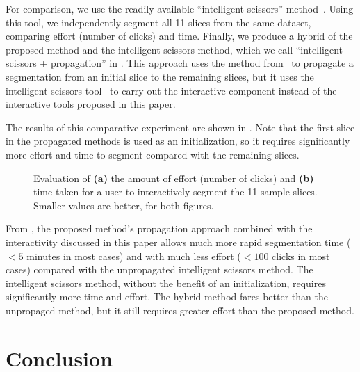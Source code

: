 \documentclass[]{spie}  %
\begin{document}
For comparison, we use the readily-available ``intelligent scissors''
method~\cite{mortensen:95}.  Using this tool, we independently segment
all 11 slices from the same dataset, comparing effort (number of
clicks) and time.  Finally, we produce a hybrid of the proposed method
and the intelligent scissors method, which we call ``intelligent
scissors + propagation'' in .  This approach uses the method
from~\cite{waggoner:11} to propagate a segmentation from an initial
slice to the remaining slices, but it uses the intelligent scissors
tool~\cite{mortensen:95} to carry out the interactive component
instead of the interactive tools proposed in this paper.

The results of this comparative experiment are shown in .
Note that the first slice in the propagated methods is used as an
initialization, so it requires significantly more effort and time to
segment compared with the remaining slices.
\begin{figure}[htbp]
\centering
{}
\hspace{0.1em}
\caption{Evaluation of \textbf{(a)} the amount of effort (number of
  clicks) and \textbf{(b)} time taken for a user to interactively
  segment the 11 sample slices.  Smaller values are better, for both
  figures.} \label{fig:ex}
\end{figure}
From , the proposed method's propagation approach combined
with the interactivity discussed in this paper allows much more rapid
segmentation time ($< 5$ minutes in most cases) and with much less
effort ($< 100$ clicks in most cases) compared with the unpropagated
intelligent scissors method.  The intelligent scissors method, without
the benefit of an initialization, requires significantly more time and
effort.  The hybrid method fares better than the unpropaged method,
but it still requires greater effort than the proposed method.

\section{Conclusion}
\label{sec:conclusion}


\end{document}
